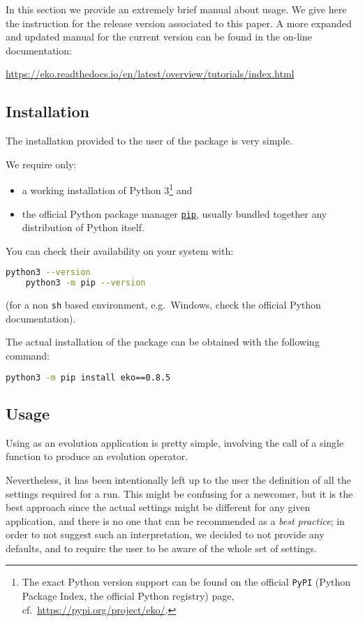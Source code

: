 In this section we provide an extremely brief manual about \eko{} usage.
We give here the instruction for the release version associated to this paper.
A more expanded and updated manual for the current version can be found in the on-line documentation:

\begin{center}
\url{https://eko.readthedocs.io/en/latest/overview/tutorials/index.html}
\end{center}

\subsection{Installation}

The installation provided to the user of the package is very simple.

We require only:
\begin{itemize}
    \item a working installation of Python 3\footnote{
            The exact Python version support can be found on the official
            \texttt{PyPI} (Python Package Index, the official Python registry)
            \eko{} page, cf.\ \url{https://pypi.org/project/eko/}.
        } and
    \item the official Python package manager
        \href{https://pip.pypa.io/}{\texttt{pip}}, usually bundled together any
        distribution of Python itself.
\end{itemize} 
You can check their availability on your system with:
\begin{lstlisting}[language=sh]
    python3 --version
    python3 -m pip --version
\end{lstlisting}
(for a non \texttt{sh} based environment, e.g.\ Windows, check the official
Python documentation).

The actual installation of the package can be obtained with the following
command:
\begin{lstlisting}[language=sh]
    python3 -m pip install eko==0.8.5
\end{lstlisting}

\subsection{Usage}

Using \eko{} as an evolution application is pretty simple, involving the call
of a single function to produce an evolution operator.

Nevertheless, it has been intentionally left up to the user the definition of
all the settings required for a run.
This might be confusing for a newcomer, but it is the best approach since the
actual settings might be different for any given application, and there is no
one that can be recommended as a \textit{best practice}; in order to not suggest
such an interpretation, we decided to not provide any defaults, and to require
the user to be aware of the whole set of settings.

